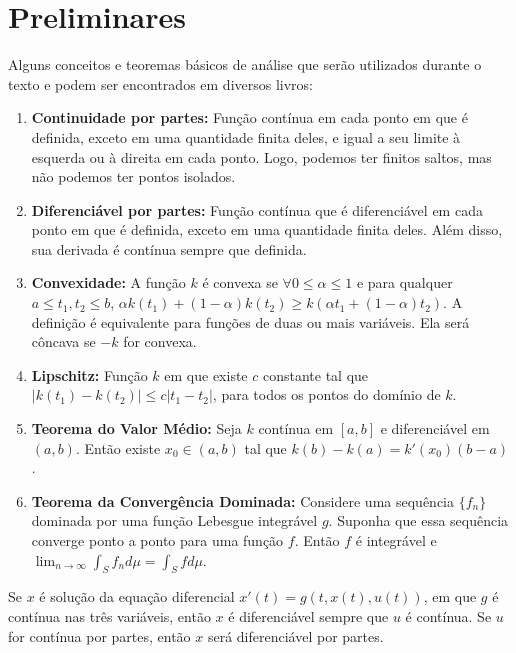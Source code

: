 \section{Preliminares}

Alguns conceitos e teoremas básicos de análise que serão utilizados durante o texto e
podem ser encontrados em diversos livros: 

\begin{enumerate}
    \item \label{piecewise-continuous} \textbf{Continuidade por partes:} Função contínua em cada
    ponto em que é definida, exceto em uma quantidade finita deles, e igual a
    seu limite à esquerda ou à direita em cada ponto. Logo, podemos ter
    finitos saltos, mas não podemos ter pontos isolados. 
    \item \textbf{Diferenciável por partes:} Função contínua que é
    diferenciável em cada ponto em que é definida, exceto em uma quantidade
    finita deles. Além disso, sua derivada é contínua sempre que definida. 
    \item \textbf{Convexidade:} A função $k$ é convexa se $\forall 0 \leq
    \alpha \leq 1$ e para qualquer $a \leq t_1,t_2 \leq b$, $\alpha k(t_1) + (1 -
    \alpha)k(t_2) \geq k(\alpha t_1 + (1 - \alpha)t_2)$. A definição é
    equivalente para funções de duas ou mais variáveis. Ela será côncava se
    $-k$ for convexa. 
    \item \textbf{Lipschitz:} Função $k$ em que existe $c$ constante tal que
    $|k(t_1) - k(t_2)| \leq c|t_1 - t_2|$, para todos os pontos do domínio de
    $k$. 
    \item \textbf{Teorema do Valor Médio:} Seja $k$ contínua em $[a,b]$ e
    diferenciável em $(a,b)$. Então existe $x_0 \in (a,b)$ tal que $k(b) -
    k(a) = k'(x_0)(b - a)$. 
    \item \label{dominated-convergence} \textbf{Teorema da Convergência Dominada:} Considere uma sequência
    $\{f_n\}$ dominada por uma função Lebesgue integrável $g$. Suponha que
    essa sequência converge ponto a ponto para uma função $f$. Então $f$ é
    integrável e $\lim_{n \to \infty} \int_S f_n d\mu = \int_S f d\mu$.
\end{enumerate}

\begin{remark}
    Se $x$ é solução da equação diferencial $x'(t) = g(t, x(t), u(t))$, em que
    $g$ é contínua nas três variáveis, então $x$ é diferenciável sempre que
    $u$ é contínua. Se $u$ for contínua por partes, então $x$ será
    diferenciável por partes. 
\end{remark}

